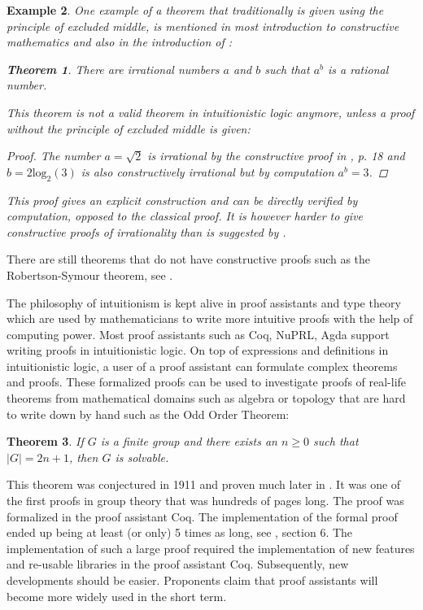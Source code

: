 \documentclass[12pt,a4paper,twoside,xetex]{book} %
\newtheorem{theorem}{Theorem}[section]
\newtheorem{example}[theorem]{Example}
\begin{document}
\begin{example}

One example of a theorem that traditionally is given using the principle of excluded middle, is mentioned in most introduction to constructive mathematics and also in the introduction of 
\cite{Palmgren2014}:

\begin{theorem}
  There are irrational numbers $a$ and $b$ such that $a^b$ is a rational number.
\end{theorem} 

This theorem is not a valid theorem in intuitionistic logic anymore, unless a proof without the principle of excluded middle is given:

\begin{proof}
The number $a = \sqrt{2}$ is irrational by the constructive proof in \cite{Rosenblatt1983}, p. 18 and $b=2\text{log}_2(3)$ is also constructively irrational but by computation $a^b=3$.
\end{proof}

This proof gives an explicit construction and can be directly verified by computation, opposed to the classical proof. It is however harder to give constructive proofs of  irrationality than is suggested by \cite{Bauer2009}.

\end{example}

There are still theorems that do not have constructive proofs such as the Robertson-Symour theorem, see \cite{BIENSTOCK1995481}.

The philosophy of intuitionism is kept alive in proof assistants and type theory which are used by mathematicians to write more intuitive proofs with the help of computing power. Most proof assistants such as Coq, NuPRL, Agda support writing proofs in intuitionistic logic. On top of expressions and definitions in intuitionistic logic, a user of a proof assistant can formulate complex theorems and proofs. These formalized proofs can be used to investigate proofs of real-life theorems from mathematical domains such as algebra or topology that are hard to write down by hand such as the Odd Order Theorem:

\begin{theorem}
If $G$ is a finite group and there exists an $n \geq 0$ such that $|G| = 2n+1$, then $G$ is solvable.
\end{theorem}

This theorem was conjectured in 1911 and proven much later in \cite{Feit1963}. It was one of the first proofs in group theory that was hundreds of pages long. The proof was formalized in the proof assistant Coq. The implementation of the formal proof ended up being at least (or only) 5 times as long, see \cite{Gonthier2013}, section 6. The implementation of such a large proof required the implementation of new features and re-usable libraries in the proof assistant Coq. Subsequently, new developments should be easier. Proponents claim that proof assistants will become more widely used in the short term.
\end{document}
